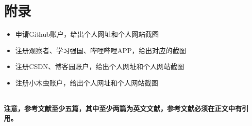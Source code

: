 \documentclass{article}
\begin{document}
\section{附录}
\begin{itemize}
    \item 申请Github账户，给出个人网址和个人网站截图
    \item 注册观察者、学习强国、哔哩哔哩APP，给出对应的截图
    \item 注册CSDN、博客园账户，给出个人网址和个人网站截图
    \item 注册小木虫账户，给出个人网址和个人网站截图
\end{itemize}


\hspace*{\fill} \\

{\bf 注意，参考文献至少五篇，其中至少两篇为英文文献，参考文献必须在正文中有引用。}


\end{document}
